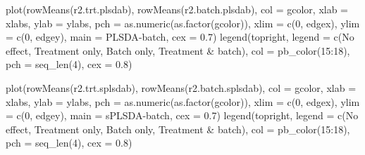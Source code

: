 \documentclass[
]{book}
\newenvironment{Shaded}{\begin{snugshade}}{\end{snugshade}}
\newcommand{\AttributeTok}[1]{\textcolor[rgb]{0.77,0.63,0.00}{#1}}
\newcommand{\DecValTok}[1]{\textcolor[rgb]{0.00,0.00,0.81}{#1}}
\newcommand{\FloatTok}[1]{\textcolor[rgb]{0.00,0.00,0.81}{#1}}
\newcommand{\FunctionTok}[1]{\textcolor[rgb]{0.00,0.00,0.00}{#1}}
\newcommand{\NormalTok}[1]{#1}
\newcommand{\SpecialCharTok}[1]{\textcolor[rgb]{0.00,0.00,0.00}{#1}}
\newcommand{\StringTok}[1]{\textcolor[rgb]{0.31,0.60,0.02}{#1}}
\begin{document}
\begin{Shaded}
\begin{Highlighting}[]
\FunctionTok{plot}\NormalTok{(}\FunctionTok{rowMeans}\NormalTok{(r2.trt.plsdab), }\FunctionTok{rowMeans}\NormalTok{(r2.batch.plsdab), }\AttributeTok{col =}\NormalTok{ gcolor, }
     \AttributeTok{xlab =}\NormalTok{ xlabs, }\AttributeTok{ylab =}\NormalTok{ ylabs, }\AttributeTok{pch =} \FunctionTok{as.numeric}\NormalTok{(}\FunctionTok{as.factor}\NormalTok{(gcolor)),}
     \AttributeTok{xlim =} \FunctionTok{c}\NormalTok{(}\DecValTok{0}\NormalTok{, edgex), }\AttributeTok{ylim =} \FunctionTok{c}\NormalTok{(}\DecValTok{0}\NormalTok{, edgey), }\AttributeTok{main =} \StringTok{\textquotesingle{}PLSDA{-}batch\textquotesingle{}}\NormalTok{, }\AttributeTok{cex =} \FloatTok{0.7}\NormalTok{)}
\FunctionTok{legend}\NormalTok{(}\StringTok{\textquotesingle{}topright\textquotesingle{}}\NormalTok{, }\AttributeTok{legend =} \FunctionTok{c}\NormalTok{(}\StringTok{\textquotesingle{}No effect\textquotesingle{}}\NormalTok{, }\StringTok{\textquotesingle{}Treatment only\textquotesingle{}}\NormalTok{, }
                              \StringTok{\textquotesingle{}Batch only\textquotesingle{}}\NormalTok{, }\StringTok{\textquotesingle{}Treatment \& batch\textquotesingle{}}\NormalTok{), }
       \AttributeTok{col =} \FunctionTok{pb\_color}\NormalTok{(}\DecValTok{15}\SpecialCharTok{:}\DecValTok{18}\NormalTok{), }\AttributeTok{pch =} \FunctionTok{seq\_len}\NormalTok{(}\DecValTok{4}\NormalTok{), }\AttributeTok{cex =} \FloatTok{0.8}\NormalTok{)}

\FunctionTok{plot}\NormalTok{(}\FunctionTok{rowMeans}\NormalTok{(r2.trt.splsdab), }\FunctionTok{rowMeans}\NormalTok{(r2.batch.splsdab), }\AttributeTok{col =}\NormalTok{ gcolor, }
     \AttributeTok{xlab =}\NormalTok{ xlabs, }\AttributeTok{ylab =}\NormalTok{ ylabs, }\AttributeTok{pch =} \FunctionTok{as.numeric}\NormalTok{(}\FunctionTok{as.factor}\NormalTok{(gcolor)),}
     \AttributeTok{xlim =} \FunctionTok{c}\NormalTok{(}\DecValTok{0}\NormalTok{, edgex), }\AttributeTok{ylim =} \FunctionTok{c}\NormalTok{(}\DecValTok{0}\NormalTok{, edgey), }\AttributeTok{main =} \StringTok{\textquotesingle{}sPLSDA{-}batch\textquotesingle{}}\NormalTok{, }\AttributeTok{cex =} \FloatTok{0.7}\NormalTok{)}
\FunctionTok{legend}\NormalTok{(}\StringTok{\textquotesingle{}topright\textquotesingle{}}\NormalTok{, }\AttributeTok{legend =} \FunctionTok{c}\NormalTok{(}\StringTok{\textquotesingle{}No effect\textquotesingle{}}\NormalTok{, }\StringTok{\textquotesingle{}Treatment only\textquotesingle{}}\NormalTok{, }
                              \StringTok{\textquotesingle{}Batch only\textquotesingle{}}\NormalTok{, }\StringTok{\textquotesingle{}Treatment \& batch\textquotesingle{}}\NormalTok{), }
       \AttributeTok{col =} \FunctionTok{pb\_color}\NormalTok{(}\DecValTok{15}\SpecialCharTok{:}\DecValTok{18}\NormalTok{), }\AttributeTok{pch =} \FunctionTok{seq\_len}\NormalTok{(}\DecValTok{4}\NormalTok{), }\AttributeTok{cex =} \FloatTok{0.8}\NormalTok{)}
\end{Highlighting}
\end{Shaded}
\end{document}
